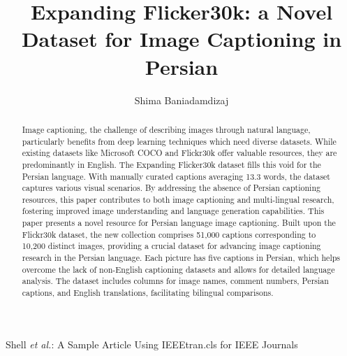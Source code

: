 \documentclass[lettersize,journal]{IEEEtran}
\begin{document}
\title{Expanding Flicker30k: a Novel Dataset for Image Captioning in Persian}

\author{Shima Baniadamdizaj}

%
{Shell \MakeLowercase{\textit{et al.}}: A Sample Article Using IEEEtran.cls for IEEE Journals}


\maketitle

\begin{abstract}
  Image captioning, the challenge of describing images through natural language, particularly benefits from deep learning techniques which need diverse datasets. While existing datasets like Microsoft COCO and Flickr30k offer valuable resources, they are predominantly in English. The Expanding Flicker30k dataset fills this void for the Persian language. With manually curated captions averaging 13.3 words, the dataset captures various visual scenarios. By addressing the absence of Persian captioning resources, this paper contributes to both image captioning and multi-lingual research, fostering improved image understanding and language generation capabilities.
  This paper presents a novel resource for Persian language image captioning. Built upon the Flickr30k dataset, the new collection comprises 51,000 captions corresponding to 10,200 distinct images, providing a crucial dataset for advancing image captioning research in the Persian language. Each picture has five captions in Persian, which helps overcome the lack of non-English captioning datasets and allows for detailed language analysis. The dataset includes columns for image names, comment numbers, Persian captions, and English translations, facilitating bilingual comparisons.
\end{abstract}

\end{document}

